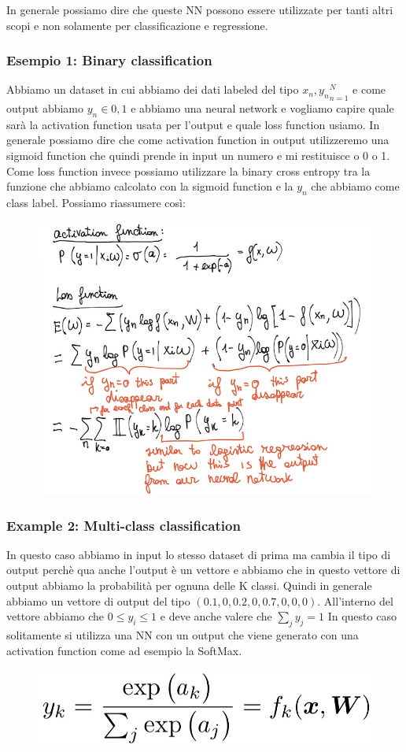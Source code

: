 \documentclass[14pt]{extreport}
\begin{document}
In generale possiamo dire che queste NN possono essere utilizzate per tanti altri scopi e non solamente per classificazione e regressione.

\subsubsection{Esempio 1: Binary classification}

Abbiamo un dataset in cui abbiamo dei dati labeled del tipo ${x_n, y_n}_{n=1}^N$ e come output abbiamo $y_n \in {0,1}$ e abbiamo una neural network e
vogliamo capire quale sarà la activation function usata per l'output e quale loss function usiamo. In generale possiamo dire che come activation
function in output utilizzeremo una sigmoid function che quindi prende in input un numero e mi restituisce o 0 o 1. Come loss function invece possiamo
utilizzare la binary cross entropy tra la funzione che abbiamo calcolato con la sigmoid function e la $y_n$ che abbiamo come class label. Possiamo
riassumere così:

\begin{figure}[H]
\centering
\includegraphics[width=0.7\linewidth]{374.jpeg}
\end{figure}

\subsubsection{Example 2: Multi-class classification}

In questo caso abbiamo in input lo stesso dataset di prima ma cambia il tipo di output perchè qua anche l'output è un vettore e abbiamo che in questo
vettore di output abbiamo la probabilità per ognuna delle K classi. Quindi in generale abbiamo un vettore di output del tipo
$(0.1,0,0.2,0,0.7,0,0,0)$. All'interno del vettore abbiamo che $0 \leq y_i \leq 1$ e deve anche valere che $\sum_{j} y_j = 1$ In questo caso
solitamente si utilizza una NN con un output che viene generato con una activation function come ad esempio la SoftMax.
\begin{figure}[H]
\centering
\includegraphics[width=0.5\linewidth]{375.jpeg}
\end{figure}
\end{document}
